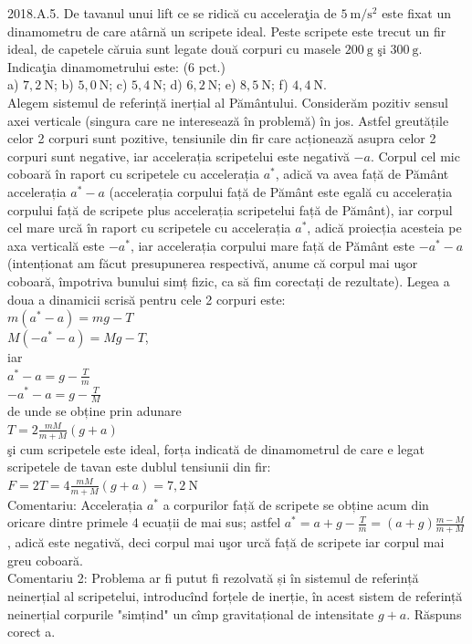 2018.A.5. De tavanul unui lift ce se ridică cu acceleraţia de $5 \mathrm{~m} / \mathrm{s}^{2}$ este fixat un dinamometru de care atârnă un scripete ideal. Peste scripete este trecut un fir ideal, de capetele căruia sunt legate două corpuri cu masele $200 \mathrm{~g}$ şi $300 \mathrm{~g}$. Indicaţia dinamometrului este: (6 pct.)\\ a) $7,2 \mathrm{~N}$; b) $5,0 \mathrm{~N}$; c) $5,4 \mathrm{~N}$; d) $6,2 \mathrm{~N}$; e) $8,5 \mathrm{~N}$; f) $4,4 \mathrm{~N}$.\\ Alegem sistemul de referință inerțial al Pământului. Considerăm pozitiv sensul axei verticale (singura care ne interesează în problemă) în jos. Astfel greutățile celor 2 corpuri sunt pozitive, tensiunile din fir care acționează asupra celor 2 corpuri sunt negative, iar accelerația scripetelui este negativă $-a$. Corpul cel mic coboară în raport cu scripetele cu accelerația $a^{*}$, adică va avea față de Pământ accelerația $a^{*}-a$ (accelerația corpului față de Pământ este egală cu accelerația corpului față de scripete plus accelerația scripetelui față de Pământ), iar corpul cel mare urcă în raport cu scripetele cu accelerația $a^{*}$, adică proiecția acesteia pe axa verticală este $-a^{*}$, iar accelerația corpului mare față de Pământ este $-a^{*}-a$ (intenționat am făcut presupunerea respectivă, anume că corpul mai uşor coboară, împotriva bunului simț fizic, ca să fim corectați de rezultate). Legea a doua a dinamicii scrisă pentru cele 2 corpuri este:\\ $m\left(a^{*}-a\right)=m g-T$\\ $M\left(-a^{*}-a\right)=M g-T$,\\ iar\\ $a^{*}-a=g-\frac{T}{m}$\\ $-a^{*}-a=g-\frac{T}{M}$\\ de unde se obține prin adunare\\ $T=2 \frac{m M}{m+M}(g+a)$\\ şi cum scripetele este ideal, forța indicată de dinamometrul de care e legat scripetele de tavan este dublul tensiunii din fir:\\ $F=2 T=4 \frac{m M}{m+M}(g+a)=7,2 \mathrm{~N}$\\ Comentariu: Accelerația $a^{*}$ a corpurilor față de scripete se obține acum din oricare dintre primele 4 ecuații de mai sus; astfel $a^{*}=a+g-\frac{T}{m}=(a+g) \frac{m-M}{m+M}$, adică este negativă, deci corpul mai uşor urcă față de scripete iar corpul mai greu coboară.\\ Comentariu 2: Problema ar fi putut fi rezolvată și în sistemul de referință neinerțial al scripetelui, introducînd forțele de inerție, în acest sistem de referință neinerțial corpurile "simțind" un cîmp gravitațional de intensitate $g+a$. Răspuns corect a.\\

